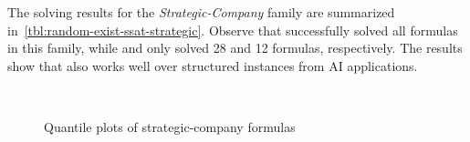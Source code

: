 The solving results for the \textit{Strategic-Company} family are summarized in~\cref{tbl:random-exist-ssat-strategic}.
Observe that \ressat successfully solved all formulas in this family,
while \dcssat and \ressatb only solved \num{28} and \num{12} formulas, respectively.
The results show that \ressat also works well over structured instances from AI applications.

\begin{figure}[hp]
    \centering
    \\
    \caption{Quantile plots of strategic-company formulas}
    \label{fig:ressat-quantile-strategic}
\end{figure}

